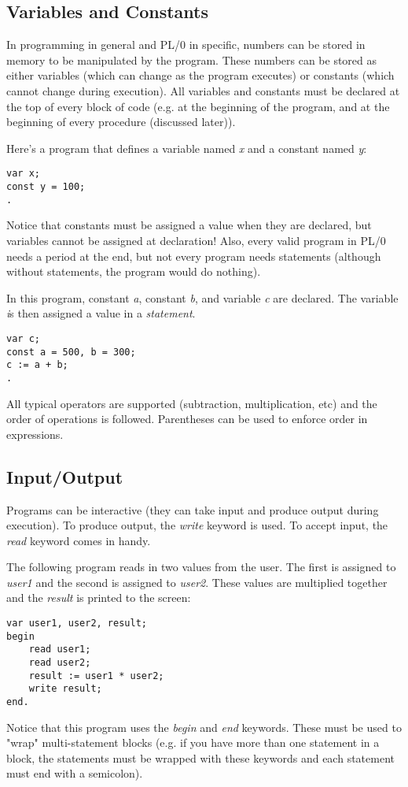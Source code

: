 \documentclass{article}
\begin{document}
\subsection*{Variables and Constants}
In programming in general and PL/0 in specific, numbers can be stored in memory to be
manipulated by the program. These numbers can be stored as either variables (which can
change as the program executes) or constants (which cannot change during execution). All
variables and constants must be declared at the top of every block of code (e.g. at the
beginning of the program, and at the beginning of every procedure (discussed later)).

Here's a program that defines a variable named \emph{x} and a constant named \emph{y}:
\begin{lstlisting}
var x;
const y = 100;
.
\end{lstlisting}
Notice that constants must be assigned a value when they are declared, but variables cannot
be assigned at declaration! Also, every valid program in PL/0 needs a period at the end, but
not every program needs statements (although without statements, the program would do nothing).

In this program, constant \emph{a}, constant \emph{b}, and variable \emph{c} are declared.
The variable \emph is then assigned a value in a \emph{statement}.
\begin{lstlisting}
var c;
const a = 500, b = 300;
c := a + b;
.
\end{lstlisting}
All typical operators are supported (subtraction, multiplication, etc) and the order of
operations is followed. Parentheses can be used to enforce order in expressions.

\subsection*{Input/Output}
Programs can be interactive (they can take input and produce output during execution). To
produce output, the \emph{write} keyword is used. To accept input, the \emph{read} keyword
comes in handy.

The following program reads in two values from the user. The first is assigned to \emph{user1}
and the second is assigned to \emph{user2}. These values are multiplied together and
the \emph{result} is printed to the screen:
\begin{lstlisting}
var user1, user2, result;
begin
    read user1;
    read user2;
    result := user1 * user2;
    write result;
end.
\end{lstlisting}
Notice that this program uses the \emph{begin} and \emph{end} keywords. These must be used
to "wrap" multi-statement blocks (e.g. if you have more than one statement in a block, the
statements must be wrapped with these keywords and each statement must end with a semicolon).
\end{document}
